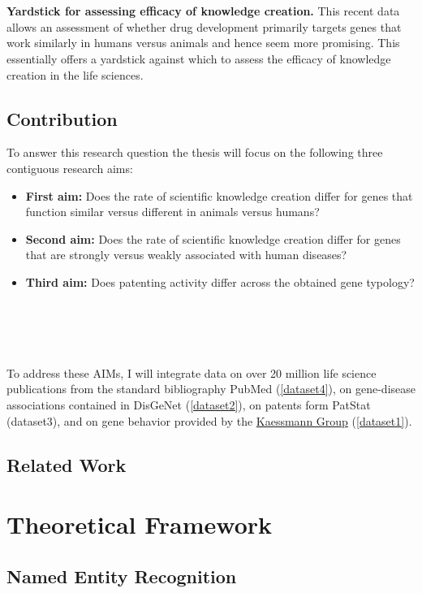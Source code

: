 \documentclass[11pt,titlepage,oneside,openany]{book}
\begin{document}
\\
\\
\textbf{Yardstick for assessing efficacy of knowledge creation.} This recent data allows an assessment of whether drug development primarily targets genes that work similarly in humans versus animals and hence seem more promising. This essentially offers a yardstick against which to assess the efficacy of knowledge creation in the life sciences.

\section{Contribution}

To answer this research question the thesis will focus on the following three contiguous research aims:
\begin{itemize}
	\item \textbf{First aim:} Does the rate of scientific knowledge creation differ for genes that function similar versus different in animals versus humans?
	\item \textbf{Second aim:} Does the rate of scientific knowledge creation differ for genes that are strongly versus weakly associated with human diseases?
	\item \textbf{Third aim:} Does patenting activity differ across the obtained gene typology?
\end{itemize}
\\
\\
\\
\\
To address these AIMs, I will integrate data on over 20 million life science publications from the standard bibliography PubMed (\ref{dataset4}), on gene-disease associations contained in DisGeNet (\ref{dataset2}), on patents form PatStat (dataset3), and on gene behavior provided by the \href{https://www.zmbh.uni-heidelberg.de/kaessmann/}{Kaessmann Group} (\ref{dataset1}).

\section{Related Work}

\chapter{Theoretical Framework}
\label{cha:theory}

\section{Named Entity Recognition}
\end{document}
